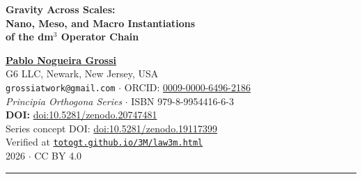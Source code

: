 \documentclass[12pt,a4paper]{article}
\theoremstyle{plain}
\theoremstyle{definition}
\theoremstyle{remark}
\newcommand{\dm}{\mathrm{dm}^3}
\newcommand{\rstar}{r^{\kern0.5pt\star}}
\begin{document}
\begin{center}
{\Large\textbf{Gravity Across Scales:\\[4pt]
Nano, Meso, and Macro Instantiations\\[4pt]
of the dm$^3$ Operator Chain}}

\vspace{.9em}
{\large\textbf{\underline{Pablo Nogueira Grossi}}}\\[.35em]
{\normalsize G6 LLC, Newark, New Jersey, USA\\
\texttt{grossiatwork@gmail.com} $\cdot$
ORCID: \href{https://orcid.org/0009-0000-6496-2186}{0009-0000-6496-2186}}\\[.3em]
{\normalsize\textit{Principia Orthogona Series} $\cdot$ ISBN 979-8-9954416-6-3}\\
{\small\textbf{DOI:} \href{https://doi.org/10.5281/zenodo.20747481}{doi:10.5281/zenodo.20747481}\\
Series concept DOI:
\href{https://doi.org/10.5281/zenodo.19117399}{doi:10.5281/zenodo.19117399}\\
Verified at \href{https://totogt.github.io/3M/law3m.html}{\texttt{totogt.github.io/3M/law3m.html}}}\\[.35em]
{\small 2026 $\cdot$ CC BY 4.0}

\vspace{.5em}
\rule{\linewidth}{0.8pt}
\end{center}

\begin{abstract}
We show that the $\dm$ operator chain $G = U\circ F\circ K\circ C$, defined on the
contact 3-manifold $(\mathbb{R}^3,\alpha=dz-r^2\,d\theta)$, has mathematically
precise instantiations at three physical scales.
We supply complete proofs of the four central mathematical results:
\textbf{(T1)} the unit helix $\Gamma=\{r=1,\dot\theta=1,\dot{z}=1\}$ is a globally
attracting limit cycle with exponential convergence rate $\mu=-2$;
\textbf{(T2)} the inner-basin boundary $\rstar$ is the Whitney $A_1$ fold of the
asymptotic radial map, certified numerically to $\rstar=0.77594059$;
\textbf{(T3)} the unique saddle of the reduced system has coordinate
$r_s = 2\cos(3\pi/7)$, root of $x^3-x^2-2x+1=0$, and
$\mathrm{tr}(J)\!\big|_{\mathrm{saddle}}=2\cos(2\pi/7)\approx1.247$;
\textbf{(T4)} the contact manifold $(\mathbb{R}^3,\alpha)$ is a local Sasakian model
with Reeb field $\partial_z$.
We further identify the proved T-duality fixed point $T^*=2\pi$ with the self-dual
radius $R=1$, and the ADE fold hierarchy $A_1\to A_2\to A_3$ with the gauge groups
$SU(2)\to SU(3)\to SU(4)$ via the McKay correspondence.
All physical claims beyond contact geometry are clearly labelled \textit{conjectured}.
\end{abstract}
\end{document}
